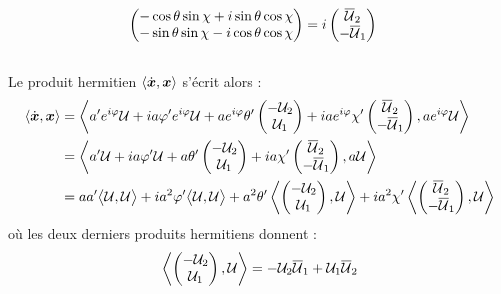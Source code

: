 \begin{annexe}
\begin{demo}
\begin{align*}
		\begin{pmatrix} -\cos\theta \sin\chi + i\sin\theta \cos\chi \\ -\sin\theta \sin\chi - i\cos\theta \cos\chi \end{pmatrix} &= i\begin{pmatrix} \overline{\mathcal{U}}_2 \\ -\overline{\mathcal{U}}_1 \end{pmatrix}
	\end{align*}
	\\
	Le produit hermitien $\langle \dot{\boldsymbol{x}}, \boldsymbol{x} \rangle$ s'écrit alors :
	\begin{align*}
		\langle \dot{\boldsymbol{x}}, \boldsymbol{x} \rangle 
		&= \left\langle a'e^{i\varphi}\mathcal{U} + ia\varphi'e^{i\varphi} \mathcal{U} + ae^{i\varphi}\theta'\begin{pmatrix} -\mathcal{U}_2 \\ \mathcal{U}_1 \end{pmatrix} + iae^{i\varphi}\chi'\begin{pmatrix} \overline{\mathcal{U}}_2 \\ -\overline{\mathcal{U}}_1 \end{pmatrix}, ae^{i\varphi}\mathcal{U} \right\rangle \\
		&= \left\langle a'\mathcal{U} + ia\varphi' \mathcal{U} + a\theta'\begin{pmatrix} -\mathcal{U}_2 \\ \mathcal{U}_1 \end{pmatrix} + ia\chi'\begin{pmatrix} \overline{\mathcal{U}}_2 \\ -\overline{\mathcal{U}}_1 \end{pmatrix}, a\mathcal{U} \right\rangle \\
		&= aa' \big\langle \mathcal{U}, \mathcal{U}\big\rangle  + ia^2\varphi' \big\langle \mathcal{U}, \mathcal{U}\big\rangle  + a^2\theta'\left\langle \begin{pmatrix} -\mathcal{U}_2 \\ \mathcal{U}_1 \end{pmatrix}, \mathcal{U} \right\rangle + ia^2\chi'\left\langle \begin{pmatrix} \overline{\mathcal{U}}_2 \\ -\overline{\mathcal{U}}_1 \end{pmatrix}, \mathcal{U} \right\rangle
	\end{align*}
	où les deux derniers produits hermitiens donnent :
	\begin{align*}
		\left\langle \begin{pmatrix} -\mathcal{U}_2 \\ \mathcal{U}_1 \end{pmatrix}, \mathcal{U} \right\rangle &= -\mathcal{U}_2\congu{\mathcal{U}}_1 + \mathcal{U}_1\congu{\mathcal{U}}_2 \\

\end{align*}
\end{demo}
\end{annexe}

